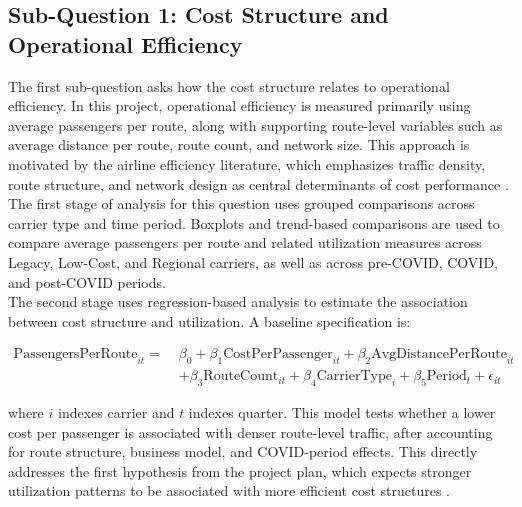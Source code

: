 \documentclass[11pt, letterpaper]{article}
\begin{document}
\subsection{Sub-Question 1: Cost Structure and Operational Efficiency}
The first sub-question asks how the cost structure relates to operational efficiency. In this project, operational efficiency is measured primarily using average passengers per route, along with supporting route-level variables such as average distance per route, route count, and network size. This approach is motivated by the airline efficiency literature, which emphasizes traffic density, route structure, and network design as central determinants of cost performance \cite{banker1993, caves1984, barbot2008, zuidberg2014}.\\
\indent The first stage of analysis for this question uses grouped comparisons across carrier type and time period. Boxplots and trend-based comparisons are used to compare average passengers per route and related utilization measures across Legacy, Low-Cost, and Regional carriers, as well as across pre-COVID, COVID, and post-COVID periods. \\
\indent The second stage uses regression-based analysis to estimate the association between cost structure and utilization. A baseline specification is:

\begin{align*}
\text{PassengersPerRoute}_{it} =\;& \beta_0 
+ \beta_1 \text{CostPerPassenger}_{it}
+ \beta_2 \text{AvgDistancePerRoute}_{it} \\
&+ \beta_3 \text{RouteCount}_{it}
+ \beta_4 \text{CarrierType}_{i}
+ \beta_5 \text{Period}_{t}
+ \epsilon_{it}
\end{align*}

where \(i\) indexes carrier and \(t\) indexes quarter. This model tests whether a lower cost per passenger is associated with denser route-level traffic, after accounting for route structure, business model, and COVID-period effects. This directly addresses the first hypothesis from the project plan, which expects stronger utilization patterns to be associated with more efficient cost structures \cite{barbot2008, zuidberg2014}.
\end{document}
